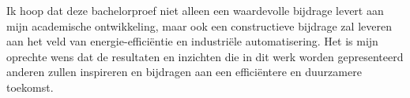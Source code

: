 Ik hoop dat deze bachelorproef niet alleen een waardevolle bijdrage levert aan mijn academische ontwikkeling, maar ook een constructieve bijdrage zal leveren aan het veld van energie-efficiëntie en industriële automatisering. Het is mijn oprechte wens dat de resultaten en inzichten die in dit werk worden gepresenteerd anderen zullen inspireren en bijdragen aan een efficiëntere en duurzamere toekomst.

